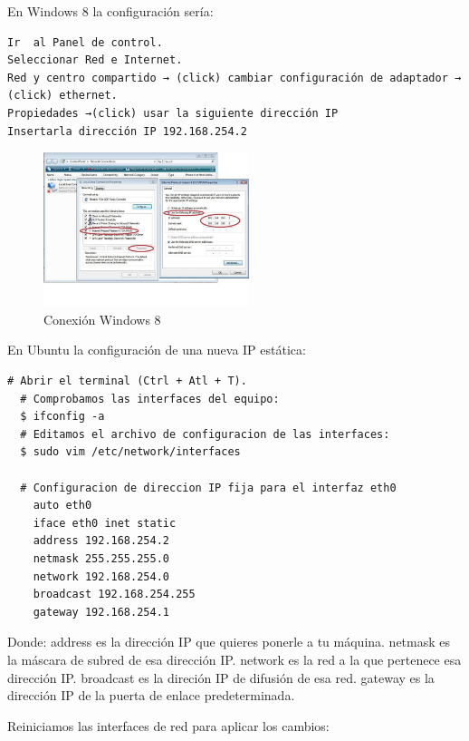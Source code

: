 \begin{enumerate}
En Windows 8 la configuración sería:

\renewcommand{\lstlistingname}{Configuración}
\begin{lstlisting}[caption= Windows 8, label={lst:config_w8}]
Ir  al Panel de control.
Seleccionar Red e Internet.
Red y centro compartido → (click) cambiar configuración de adaptador → (click) ethernet.
Propiedades →(click) usar la siguiente dirección IP
Insertarla dirección IP 192.168.254.2
\end{lstlisting}

\begin{figure} [hbtp]
\begin{center}
  \includegraphics[width=6cm]{img/cap3/3_4/conexion}
\end{center}
\caption{Conexión Windows 8}
\label{fig:w8}
\end{figure}
\newpage
En Ubuntu la configuración de una nueva IP estática:

\renewcommand{\lstlistingname}{Configuración}
\begin{lstlisting}[caption= Ubuntu, label={lst:config_ubuntu}]
  # Abrir el terminal (Ctrl + Atl + T).
  # Comprobamos las interfaces del equipo:  
  $ ifconfig -a
  # Editamos el archivo de configuracion de las interfaces:  
  $ sudo vim /etc/network/interfaces

  # Configuracion de direccion IP fija para el interfaz eth0
    auto eth0
    iface eth0 inet static
    address 192.168.254.2
    netmask 255.255.255.0
    network 192.168.254.0
    broadcast 192.168.254.255
    gateway 192.168.254.1
\end{lstlisting}

  Donde:
    \subsubitem address es la dirección IP que quieres ponerle a tu máquina.
    \subsubitem netmask es la máscara de subred de esa dirección IP.
    \subsubitem network es la red a la que pertenece esa dirección IP.
    \subsubitem broadcast es la direción IP de difusión de esa red.
    \subsubitem gateway es la dirección IP de la puerta de enlace predeterminada.

\subitem Reiniciamos las interfaces de red para aplicar los cambios:


\end{enumerate}
